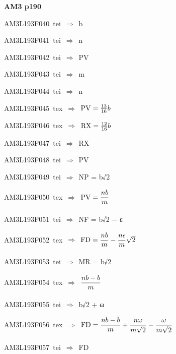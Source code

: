 \par\vfill\eject
{\bf\hfill AM3 p190\hfill\hbox{}}\par\bigskip
{\sixrm AM3L193F040\ {\sixit tei}\ }$\Rightarrow$\ {\tenit b}\par\smallskip
{\sixrm AM3L193F041\ {\sixit tei}\ }$\Rightarrow$\ {\tenit n}\par\smallskip
{\sixrm AM3L193F042\ {\sixit tei}\ }$\Rightarrow$\ PV\par\smallskip
{\sixrm AM3L193F043\ {\sixit tei}\ }$\Rightarrow$\ {\tenit m}\par\smallskip
{\sixrm AM3L193F044\ {\sixit tei}\ }$\Rightarrow$\ {\tenit n}\par\smallskip
{\sixrm AM3L193F045\ {\sixit tex}\ }$\Rightarrow$\ ${\rm PV} = {{13\over 16}}b$\par\smallskip
{\sixrm AM3L193F046\ {\sixit tex}\ }$\Rightarrow$\ ${\rm RX} = {{12\over 16}}b$\par\smallskip
{\sixrm AM3L193F047\ {\sixit tei}\ }$\Rightarrow$\ RX\par\smallskip
{\sixrm AM3L193F048\ {\sixit tei}\ }$\Rightarrow$\ PV\par\smallskip
{\sixrm AM3L193F049\ {\sixit tei}\ }$\Rightarrow$\ NP = {\tenit b}√2\par\smallskip
{\sixrm AM3L193F050\ {\sixit tex}\ }$\Rightarrow$\ ${\rm PV} = {\displaystyle\strut nb\over \displaystyle\strut m}$\par\smallskip
{\sixrm AM3L193F051\ {\sixit tei}\ }$\Rightarrow$\ NF = {\tenit b}√2 −  ε\par\smallskip
{\sixrm AM3L193F052\ {\sixit tex}\ }$\Rightarrow$\ ${\rm FD} = {\displaystyle\strut nb\over \displaystyle\strut m} - {\displaystyle\strut {n \epsilon  }\over \displaystyle\strut m}\sqrt{2}$\par\smallskip
{\sixrm AM3L193F053\ {\sixit tei}\ }$\Rightarrow$\ MR = {\tenit b}√2\par\smallskip
{\sixrm AM3L193F054\ {\sixit tex}\ }$\Rightarrow$\ ${\displaystyle\strut {nb - b}\over \displaystyle\strut m}$\par\smallskip
{\sixrm AM3L193F055\ {\sixit tei}\ }$\Rightarrow$\ {\tenit b}√2 +  ω\par\smallskip
{\sixrm AM3L193F056\ {\sixit tex}\ }$\Rightarrow$\ ${\rm FD} = {\displaystyle\strut {nb - b}\over \displaystyle\strut m} + {\displaystyle\strut {n \omega  }\over \displaystyle\strut {m\sqrt{2}}} -  {\displaystyle\strut \omega  \over  \displaystyle\strut {m\sqrt{2}}}$\par\smallskip
{\sixrm AM3L193F057\ {\sixit tei}\ }$\Rightarrow$\ FD\par\smallskip

